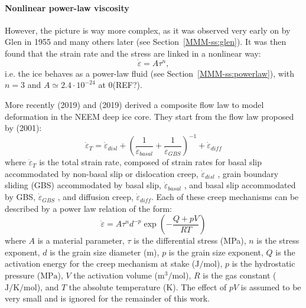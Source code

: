 \paragraph{Nonlinear power-law viscosity}
However, the picture is way more complex, as it was observed very early on 
by Glen in 1955 \cite{glen55} and many others later (see Section~\ref{MMM-ss:glen}). 
It was then found that the strain rate and the stress are linked in a nonlinear way: 
\[
\dot{\varepsilon} = A \tau^n,
\]
i.e. the ice behaves as a power-law fluid (see Section~\ref{MMM-ss:powerlaw}), with 
$n=3$ and $A\simeq 2.4\cdot 10^{-24}$ at 0\degree (REF?).

More recently \textcite{kuwd19} (2019) and \textcite{kudd19} (2019) derived a composite flow law 
to model deformation in the NEEM deep ice core. 
They start from the flow law proposed by \textcite{goko01} (2001):
\[
\dot{\varepsilon}_T = \dot{\varepsilon}_{disl} + 
\left(\frac{1}{ \dot{\varepsilon}_{basal}} + \frac{1}{ \dot{\varepsilon}_{GBS}} \right)^{-1} 
+  \dot{\varepsilon}_{diff}
\]
where $\dot{\varepsilon}_T$  is the total strain rate, 
composed of strain rates for basal slip accommodated by non-basal slip or dislocation creep,
$\dot{\varepsilon}_{disl}$ , grain boundary sliding (GBS) accommodated by basal slip, 
$\dot{\varepsilon}_{basal}$ , and basal slip accommodated by GBS, 
$\dot{\varepsilon}_{GBS}$ , and diffusion creep, 
$\dot{\varepsilon}_{diff}$. Each of these creep mechanisms can be described by a 
power law relation of the form:
\[
\dot{\varepsilon} = A \tau^n d^{-p} \exp \left( -\frac{Q+pV}{RT} \right)
\]
where $A$ is a material parameter, $\tau$ is the differential stress (MPa), 
$n$ is the stress exponent, $d$ is the grain size diameter (\si{\meter}), 
$p$ is the grain size exponent, $Q$ is the activation energy for the creep 
mechanism at stake ($\si{\joule\per\mole}$), $p$ is the hydrostatic pressure ($\si{\mega\pascal}$), 
$V$ the activation volume ($\si{\cubic\meter\per\mole}$), 
$R$ is the gas constant ($\si{\joule\per\kelvin\per\mole}$), 
and $T$ the absolute temperature ($\si{\kelvin}$). 
The effect of $pV$ is assumed to be very small \cite{dust01} 
and is ignored for the remainder of this work.

